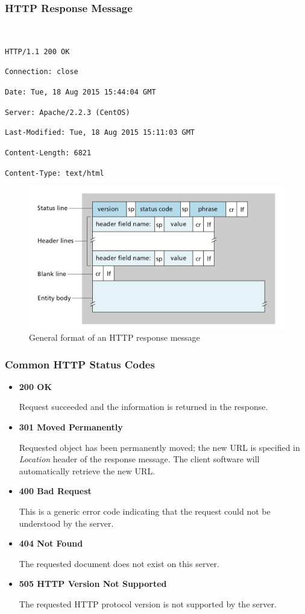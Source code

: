 \documentclass[11pt]{article}
\begin{document}
\subsubsection{HTTP Response Message}

~\

\texttt{HTTP/1.1 200 OK}

\texttt{Connection: close}

\texttt{Date: Tue, 18 Aug 2015 15:44:04 GMT}

\texttt{Server: Apache/2.2.3 (CentOS)}

\texttt{Last-Modified: Tue, 18 Aug 2015 15:11:03 GMT}

\texttt{Content-Length: 6821}

\texttt{Content-Type: text/html}

\begin{figure}[h]
	\centering
	\includegraphics[width=0.8\linewidth]{images/HttpResponse.png}
	\caption{General format of an HTTP response message}
	\label{fig:HttpResponse}
\end{figure}

\subsubsection{Common HTTP Status Codes}

\begin{itemize}
	\item \textbf{200 OK}
	
	Request succeeded and the information is returned in the response.
	
	\item \textbf{301 Moved Permanently}
	
	Requested object has been permanently moved; the new URL is specified in \textit{Location} header of the response message. The client software will automatically retrieve the new URL.
	
	\item \textbf{400 Bad Request}
	
	This is a generic error code indicating that the request could not be understood by the server.
	
	\item \textbf{404 Not Found}
	
	The requested document does not exist on this server.
	
	\item \textbf{505 HTTP Version Not Supported}
	
	 The requested HTTP protocol version is not supported by the server.
	 
\end{itemize}
\end{document}
